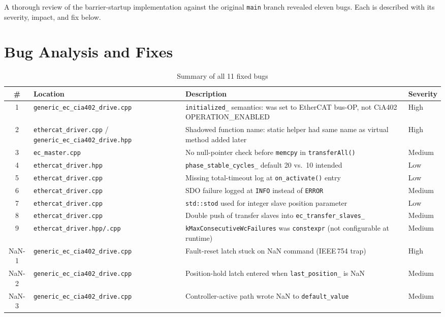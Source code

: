 \documentclass[11pt,a4paper]{article}
\begin{document}
A thorough review of the barrier-startup implementation against the original
\texttt{main} branch revealed eleven bugs.  Each is described with its
severity, impact, and fix below.

\section{Bug Analysis and Fixes}
\label{sec:bugs}

\begin{table}[H]
  \centering
  \caption{Summary of all 11 fixed bugs}
  \label{tab:bugs}
  \small
  \begin{tabularx}{\textwidth}{@{}c l X l@{}}
    \toprule
    \# & Location & Description & Severity \\
    \midrule
    1 & \texttt{generic\_ec\_cia402\_drive.cpp} &
        \texttt{initialized\_} semantics: was set to EtherCAT bus-OP, not
        CiA402 OPERATION\_ENABLED & High \\
    2 & \texttt{ethercat\_driver.cpp} /
        \texttt{generic\_ec\_cia402\_drive.hpp} &
        Shadowed function name: static helper had same name as virtual
        method added later & High \\
    3 & \texttt{ec\_master.cpp} &
        No null-pointer check before \texttt{memcpy} in
        \texttt{transferAll()} & Medium \\
    4 & \texttt{ethercat\_driver.hpp} &
        \texttt{phase\_stable\_cycles\_} default 20 vs.\ 10 intended & Low \\
    5 & \texttt{ethercat\_driver.cpp} &
        Missing total-timeout log at \texttt{on\_activate()} entry & Low \\
    6 & \texttt{ethercat\_driver.cpp} &
        SDO failure logged at \texttt{INFO} instead of \texttt{ERROR} & Medium \\
    7 & \texttt{ethercat\_driver.cpp} &
        \texttt{std::stod} used for integer slave position parameter & Low \\
    8 & \texttt{ethercat\_driver.cpp} &
        Double push of transfer slaves into \texttt{ec\_transfer\_slaves\_} & Medium \\
    9 & \texttt{ethercat\_driver.hpp/.cpp} &
        \texttt{kMaxConsecutiveWcFailures} was \texttt{constexpr} (not
        configurable at runtime) & Medium \\
    NaN-1 & \texttt{generic\_ec\_cia402\_drive.cpp} &
        Fault-reset latch stuck on NaN command (IEEE\,754 trap) & High \\
    NaN-2 & \texttt{generic\_ec\_cia402\_drive.cpp} &
        Position-hold latch entered when \texttt{last\_position\_} is NaN & Medium \\
    NaN-3 & \texttt{generic\_ec\_cia402\_drive.cpp} &
        Controller-active path wrote NaN to \texttt{default\_value} & Medium \\
    \bottomrule
  \end{tabularx}
\end{table}
\end{document}
